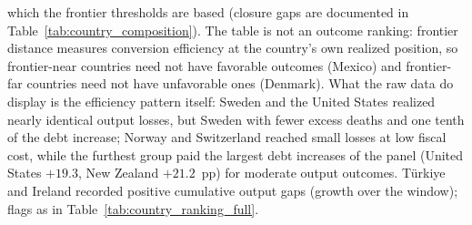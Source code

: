 \documentclass[12pt, a4paper]{article}
\begin{document}
\begin{table}[H]
\begin{minipage}{0.95\textwidth}
which the frontier thresholds are based (closure gaps are documented in
Table~\ref{tab:country_composition}). The table is not an outcome ranking:
frontier distance measures conversion efficiency at the country's own
realized position, so frontier-near countries need not have favorable
outcomes (Mexico) and frontier-far countries need not have unfavorable ones
(Denmark). What the raw data do display is the efficiency pattern itself:
Sweden and the United States realized nearly identical output losses, but
Sweden with fewer excess deaths and one tenth of the debt increase; Norway
and Switzerland reached small losses at low fiscal cost, while the furthest
group paid the largest debt increases of the panel (United States \(+19.3\),
New Zealand \(+21.2\)~pp) for moderate output outcomes. T\"urkiye and Ireland
recorded positive cumulative output gaps (growth over the window); flags as
in Table~\ref{tab:country_ranking_full}.
\end{minipage}
\end{table}
\end{document}

